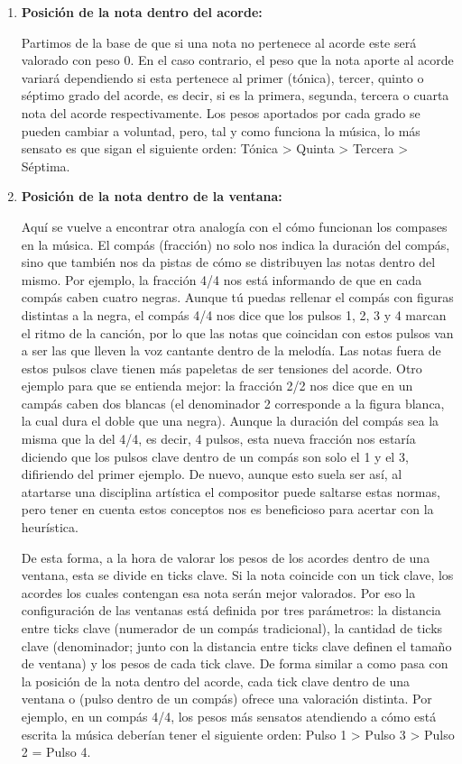 \begin{enumerate}
    \item[\textbullet] \textbf{Posición de la nota dentro del acorde:}

    Partimos de la base de que si una nota no pertenece al acorde este será valorado con peso 0. En el caso contrario, el peso que la nota aporte al acorde variará dependiendo si esta pertenece al primer (tónica), tercer, quinto o  séptimo grado del acorde, es decir, si es la primera, segunda, tercera o cuarta nota del acorde respectivamente. Los pesos aportados por cada grado se pueden cambiar a voluntad, pero, tal y como funciona la música, lo más sensato es que sigan el siguiente orden: Tónica > Quinta > Tercera > Séptima. 
    
    \item[\textbullet] \textbf{Posición de la nota dentro de la ventana:}

    Aquí se vuelve a encontrar otra analogía con el cómo funcionan los compases en la música. El compás (fracción) no solo nos indica la duración del compás, sino que también nos da pistas de cómo se distribuyen las notas dentro del mismo. Por ejemplo, la fracción 4/4 nos está informando de que en cada compás caben cuatro negras. Aunque tú puedas rellenar el compás con figuras distintas a la negra, el compás 4/4 nos dice que los pulsos 1, 2, 3 y 4 marcan el ritmo de la canción, por lo que las notas que coincidan con estos pulsos van a ser las que lleven la voz cantante dentro de la melodía. Las notas fuera de estos pulsos clave tienen más papeletas de ser tensiones del acorde. Otro ejemplo para que se entienda mejor: la fracción 2/2 nos dice que en un campás caben dos blancas (el denominador 2 corresponde a la figura blanca, la cual dura el doble que una negra). Aunque la duración del compás sea la misma que la del 4/4, es decir, 4 pulsos, esta nueva fracción nos estaría diciendo que los pulsos clave dentro de un compás son solo el 1 y el 3, difiriendo del primer ejemplo. De nuevo, aunque esto suela ser así, al atartarse una disciplina artística el compositor puede saltarse estas normas, pero tener en cuenta estos conceptos nos es beneficioso para acertar con la heurística.

    De esta forma, a la hora de valorar los pesos de los acordes dentro de una ventana, esta se divide en ticks clave. Si la nota coincide con un tick clave, los acordes los cuales contengan esa nota serán mejor valorados. Por eso la configuración de las ventanas está definida por tres parámetros: la distancia entre ticks clave (numerador de un compás tradicional), la cantidad de ticks clave (denominador; junto con la distancia entre ticks clave definen el tamaño de ventana) y los pesos de cada tick clave. De forma similar a como pasa con la posición de la nota dentro del acorde, cada tick clave dentro de una ventana o (pulso dentro de un compás) ofrece una valoración distinta. Por ejemplo, en un compás 4/4, los pesos más sensatos atendiendo a cómo está escrita la música deberían tener el siguiente orden: Pulso 1 > Pulso 3 > Pulso 2 = Pulso 4.


\end{enumerate}
